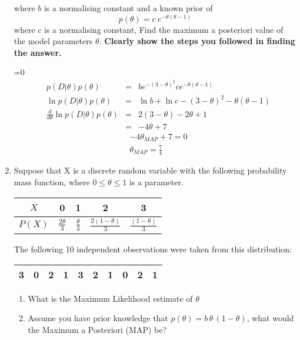 \documentclass [11pt]{article}
\def\answers{0}
\newcommand{\answer}[1]{\ifnum\answers=0{\color{red}{\bf Answer:}\\\it{#1}}\fi}
\begin{document}
\begin{enumerate}
where $b$ is a normalising constant and a known prior of
\begin{equation*}
p(\theta) = c \ e^{-\theta (\theta-1)}
\end{equation*}
where $c$ is a normalising constant,
Find the maximum a posteriori value of the model parameters $\theta$. \textbf{Clearly show the steps you followed in finding the answer.}

\answer{
\begin{align}
&p(D|\theta) p(\theta) &= &b e^{-(3-\theta)^2} c e^{-\theta(\theta-1)}\\
&\ln p(D|\theta) p(\theta) &= &\ln b + \ln c - (3-\theta)^2 - \theta(\theta-1)\\
&\frac{d}{d\theta} \ln p(D|\theta) p(\theta) &= &2 (3-\theta) - 2\theta +1\\
&&= &-4 \theta +7
\end{align}
\begin{align}
&-4 \theta_{MAP} + 7 = 0\\
&\theta_{MAP} = \frac{7}{4}
\end{align}
}

\item Suppose that X is a discrete random variable with the following probability mass function, where $0 \le \theta \le 1$ is a parameter.

\begin{center}
\begin{tabular}{|c|c|c|c|c|}
\hline
$X$ &0 &1 &2 &3\\ \hline
$P(X)$ &$\frac{2 \theta}{3}$ &$\frac{\theta}{3}$ &$\frac{2(1-\theta)}{3}$ &$\frac{(1-\theta)}{3}$\\ \hline
\end{tabular}
\end{center}

The following 10 independent observations were taken from this distribution:

\begin{center}
\begin{tabular}{|c|c|c|c|c|c|c|c|c|c|}
\hline
3 &0 &2 &1 &3 &2 &1 &0 &2 &1\\ \hline
\end{tabular}
\end{center}

\begin{enumerate}
\item What is the Maximum Likelihood estimate of $\theta$
\item Assume you have prior knowledge that $p(\theta) = b\, \theta \, (1-\theta)$, what would the Maximum a Posteriori (MAP) be?
\end{enumerate}


\end{enumerate}
\end{document}
